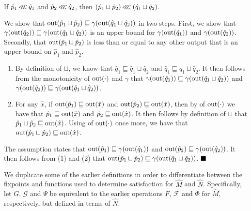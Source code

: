 \begin{lemma} \label{lem:join-refine}
If $\hat p_{1} \operatorname{\lll} \hat q_{1}$ and $\hat p_{2} \operatorname{\lll} \hat q_{2}$, then $(\hat p_{1} \sqcup \hat p_{2}) \operatorname{\lll} \: (\hat q_{1} \sqcup \hat q_{2})$.
\end{lemma}

We show that $\operatorname{out}(\hat p_{1} \sqcup \hat p_{2}) \sqsubseteq \gamma(\operatorname{out}(\hat q_{1} \sqcup \hat q_{2}))$ in two steps. First, we show that $\gamma(\operatorname{out}(\hat q_{2})) \sqsubseteq \gamma(\operatorname{out}(\hat q_{1} \sqcup \hat q_{2}))$ is an upper bound for $\gamma(\operatorname{out}(\hat q_{1}))$ and $\gamma(\operatorname{out}(\hat q_{2}))$. Secondly, that $\operatorname{out}(\hat p_{1} \sqcup \hat p_{2})$ is less than or equal to any other output that is an upper bound on $\hat p_{1}$ and $\hat p_{2}$.

\begin{enumerate}

\item By definition of $\sqcup$, we know that $\hat q_{1} \sqsubseteq \hat q_{1} \sqcup \hat q_{2}$ and $\hat q_{1} \sqsubseteq \hat q_{1} \sqcup \hat q_{2}$. It then follows from the monotonicity of $\operatorname{out}(\cdot)$ and $\gamma$ that $\gamma(\operatorname{out}(\hat q_{1})) \sqsubseteq \gamma(\operatorname{out}(\hat q_{1} \sqcup \hat q_{2}))$ and $\gamma(\operatorname{out}(\hat q_{2})) \sqsubseteq \gamma(\operatorname{out}(\hat q_{1} \sqcup \hat q_{2}))$.

\item For any $\hat x$, if $\operatorname{out}(\hat p_{1}) \sqsubseteq \operatorname{out}(\hat x)$ and $\operatorname{out}(\hat p_{2}) \sqsubseteq \operatorname{out}(\hat x)$, then by  of $\operatorname{out}(\cdot)$ we have that $\hat p_{1} \sqsubseteq \operatorname{out}(\hat x)$ and $\hat p_{2} \sqsubseteq \operatorname{out}(\hat x)$. It then follows by definition of $\sqcup$ that $\hat p_{1} \sqcup \hat p_{2} \sqsubseteq \operatorname{out}(\hat x)$. Using  of $\operatorname{out}(\cdot)$ once more, we have that $\operatorname{out}(\hat p_{1} \sqcup \hat p_{2}) \sqsubseteq \operatorname{out}(\hat x)$.

\end{enumerate}


The assumption states that $\operatorname{out}(\hat p_{1}) \sqsubseteq \gamma(\operatorname{out}(\hat q_{1}))$ and $\operatorname{out}(\hat p_{2}) \sqsubseteq \gamma(\operatorname{out}(\hat q_{2}))$. It then follows from (1) and (2) that $\operatorname{out}(\hat p_{1} \sqcup \hat p_{2}) \sqsubseteq \gamma(\operatorname{out}(\hat q_{1} \sqcup \hat q_{2}))$. $\qedb$


We duplicate some of the earlier definitions in order to differentiate between the fixpoints and functions used to determine satisfaction for $\hat M$ and $\hat N$. Specifically, let $G$, $\mathcal{G}$ and $\Psi$ be equivalent to the earlier operations $F$, $\mathcal{F}$ and $\Phi$ for $\hat M$, respectively, but defined in terms of $\hat N$:

